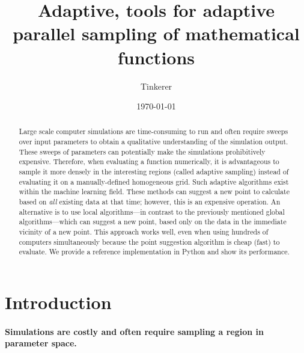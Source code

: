 \documentclass[english, twocolumn, 10pt, aps, superscriptaddress, floatfix, prb, citeautoscript]{revtex4-1}
\begin{document}
\title{Adaptive, tools for adaptive parallel sampling of mathematical functions}

\author{Tinkerer}

\date{\today}

\begin{abstract}
Large scale computer simulations are time-consuming to run and often require sweeps over input parameters to obtain a qualitative understanding of the simulation output.
These sweeps of parameters can potentially make the simulations prohibitively expensive.
Therefore, when evaluating a function numerically, it is advantageous to sample it more densely in the interesting regions (called adaptive sampling) instead of evaluating it on a manually-defined homogeneous grid.
Such adaptive algorithms exist within the machine learning field.
These methods can suggest a new point to calculate based on \textit{all} existing data at that time; however, this is an expensive operation.
An alternative is to use local algorithms---in contrast to the previously mentioned global algorithms---which can suggest a new point, based only on the data in the immediate vicinity of a new point.
This approach works well, even when using hundreds of computers simultaneously because the point suggestion algorithm is cheap (fast) to evaluate.
We provide a reference implementation in Python and show its performance.
\end{abstract}

\flushbottom
\maketitle

\hypertarget{introduction}{%
\section{Introduction}\label{introduction}}

\hypertarget{simulations-are-costly-and-often-require-sampling-a-region-in-parameter-space.}{%
\paragraph{Simulations are costly and often require sampling a region in parameter space.}\label{simulations-are-costly-and-often-require-sampling-a-region-in-parameter-space.}}
\end{document}
